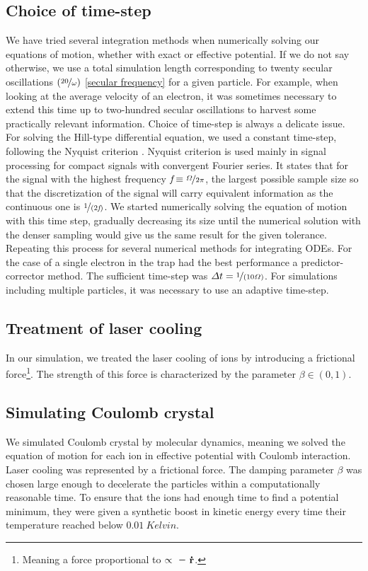 \subsection{Choice of time-step}
We have tried several integration methods when numerically solving our equations of motion, whether with exact or effective potential. If we do not say otherwise, we use a total simulation length corresponding to twenty secular oscillations $(\nicefrac{20}{\omega})$ \eqref{secular frequency} for a given particle. For example, when looking at the average velocity of an electron, it was sometimes necessary to extend this time up to two-hundred secular oscillations to harvest some practically relevant information.
Choice of time-step is always a delicate issue. For solving the Hill-type differential equation, we used a constant time-step, following the Nyquist criterion \cite{1697831}. Nyquist criterion is used mainly in signal processing for compact signals with convergent Fourier series. It states that for the signal with the highest frequency $\textit{f} \equiv \nicefrac{\Omega}{2\pi}$, the largest possible sample size so that the discretization of the signal will carry equivalent information as the continuous one is $\nicefrac{1}{(2\textit{f})}$. We started numerically solving the equation of motion with this time step, gradually decreasing its size until the numerical solution with the denser sampling would give us the same result for the given tolerance. Repeating this process for several numerical methods \cite{teukolsky1992numerical} for integrating ODEs. For the case of a single electron in the trap had the best performance a predictor-corrector method. The sufficient time-step was $\Delta t = \nicefrac{1}{(10 \Omega)}$. For simulations including multiple particles, it was necessary to use an adaptive time-step. 

\subsection{Treatment of laser cooling}
In our simulation, we treated the laser cooling of ions by introducing a frictional force\footnote{Meaning a force proportional to $\propto \minus \vb{\dot{r}}$.}.  The strength of this force is characterized by the parameter $\beta \in (0,1)$. 

\subsection{Simulating Coulomb crystal}
We simulated Coulomb crystal by molecular dynamics, meaning we solved the equation of motion for each ion in effective potential with Coulomb interaction. Laser cooling was represented by a frictional force. The damping parameter $\beta$ was chosen large enough to decelerate the particles within a computationally reasonable time. To ensure that the ions had enough time to find a potential minimum, they were given a synthetic boost in kinetic energy every time their temperature reached below $\SI{0.01}{Kelvin}$. 

